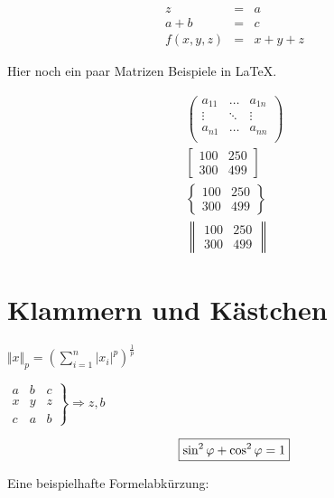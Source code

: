 \begin{equation}
	\begin{array}{lcl}
		z & = & a \\
		a + b & = & c \\
		f(x,y,z) & = & x + y + z
	\end{array}
\end{equation}

Hier noch ein paar Matrizen Beispiele in \LaTeX{}.

\begin{align}
	\begin{pmatrix}
		a_{11}	& \dots   & a_{1n}\\
		\vdots	& \ddots  & \vdots\\
		a_{n1}	& \dots   & a_{nn}\\
	\end{pmatrix}
	\\[0.4cm]
	\begin{bmatrix} 
		100&250\\
		300&499
	\end{bmatrix}
	\\[0.4cm]
	\begin{Bmatrix} 
		100&250\\
		300&499
	\end{Bmatrix}
	\\[0.4cm]
	\begin{Vmatrix}
		100&250\\
		300&499
	\end{Vmatrix}
\end{align}

\section{Klammern und Kästchen}

\begin{center}
	\( \Vert x\Vert_{p}=
	\left(
	\sum_{i=1}^{n} | x_{i} |^{p}
	\right)^{\frac{1}{p}} \)
\end{center}

\begin{center}
	\( \left.
	\begin{array}{lc|r}
		a&b&c\\
		\hline
		x&y&z\\
		c&a&b
	\end{array}
	\right\}
	\Rightarrow z,b \)
\end{center}

\begin{equation*}
\mbox{
	\boxed{
		\sin^2\varphi+\cos^2\varphi=1
	}
}
\end{equation*}


Eine beispielhafte Formelabkürzung: 


